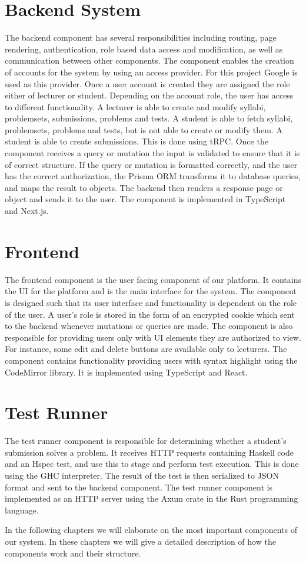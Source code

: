 \section{Backend System}
The backend component has several responsibilities including routing, page rendering, authentication, role based data access and modification, as well as communication between other components. 
The component enables the creation of accounts for the system by using an access provider.
For this project Google is used as this provider. 
Once a user account is created they are assigned the role either of lecturer or student.  
Depending on the account role, the user has access to different functionality.
A lecturer is able to create and modify syllabi, problemsets, submissions, problems and tests. 
A student is able to fetch syllabi, problemsets, problems and tests, but is not able to create or modify them. 
A student is able to create submissions.
This is done using tRPC. 
Once the component receives a query or mutation the input is validated to ensure that it is of correct structure.
If the query or mutation is formatted correctly, and the user has the correct authorization, the Prisma ORM transforms it to database queries, and maps the result to \javascript{} objects.
The backend then renders a response page or object and sends it to the user.
The component is implemented in TypeScript and Next.js.

\section{Frontend} \label{sec:architecture-frontend}
The frontend component is the user facing component of our platform.  It contains the UI for the platform and is the main interface for the system.
The component is designed such that its user interface and functionality is dependent on the role of the user. 
A user's role is stored in the form of an encrypted cookie which sent to the backend whenever mutations or queries are made. 
The component is also responsible for providing users only with UI elements they are authorized to view. 
For instance, some edit and delete buttons are available only to lecturers.
The component contains functionality providing users with syntax highlight using the CodeMirror library. 
It is implemented using TypeScript and React. 

\section{Test Runner}
The test runner component is responsible for determining whether a student's submission solves a problem. 
It receives HTTP requests containing Haskell code and an Hspec test, and use this to stage and perform test execution. 
This is done using the GHC interpreter.
The result of the test is then serialized to JSON format and sent to the backend component.
The test runner component is implemented as an HTTP server using the Axum crate in the Rust programming language.

In the following chapters we will elaborate on the most important components of our system. In these chapters we will give a detailed description of how the components work and their structure.